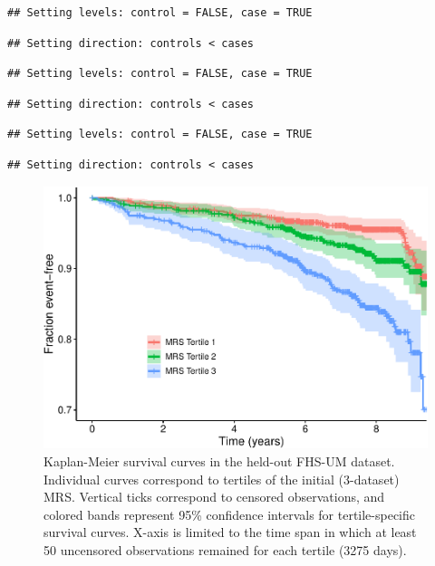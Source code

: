 \documentclass[]{article}
\begin{document}
\begin{verbatim}
## Setting levels: control = FALSE, case = TRUE
\end{verbatim}

\begin{verbatim}
## Setting direction: controls < cases
\end{verbatim}

\begin{verbatim}
## Setting levels: control = FALSE, case = TRUE
\end{verbatim}

\begin{verbatim}
## Setting direction: controls < cases
\end{verbatim}

\begin{verbatim}
## Setting levels: control = FALSE, case = TRUE
\end{verbatim}

\begin{verbatim}
## Setting direction: controls < cases
\end{verbatim}

\begin{figure}
\centering
\includegraphics{figures/km-plot-1.pdf}
\caption{Kaplan-Meier survival curves in the held-out FHS-UM dataset.
Individual curves correspond to tertiles of the initial (3-dataset) MRS.
Vertical ticks correspond to censored observations, and colored bands
represent 95\% confidence intervals for tertile-specific survival
curves. X-axis is limited to the time span in which at least 50
uncensored observations remained for each tertile (3275 days).}
\end{figure}
\end{document}
